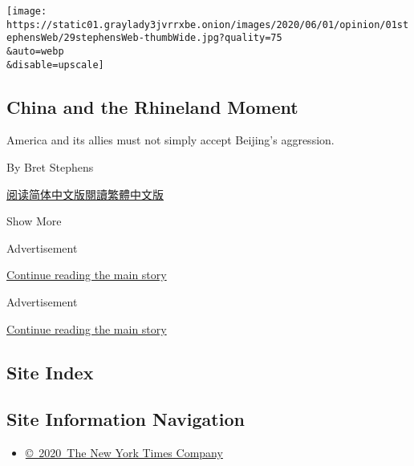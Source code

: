 \begin{enumerate}
  \texttt{[image: https://static01.graylady3jvrrxbe.onion/images/2020/06/01/opinion/01stephensWeb/29stephensWeb-thumbWide.jpg?quality=75\\\&auto=webp\\\&disable=upscale]}

  \hypertarget{china-and-the-rhineland-moment}{%
  \subsection{China and the Rhineland
  Moment}\label{china-and-the-rhineland-moment}}

  America and its allies must not simply accept Beijing's aggression.

  By Bret Stephens

  \href{https://cn.nytimes3xbfgragh.onion/opinion/20200604/china-hong-kong/}{阅读简体中文版}\href{https://cn.nytimes3xbfgragh.onion/opinion/20200604/china-hong-kong/zh-hant/}{閱讀繁體中文版}
\end{enumerate}

Show More

Advertisement

\protect\hyperlink{after-mid1}{Continue reading the main story}

Advertisement

\protect\hyperlink{after-mktg}{Continue reading the main story}

\hypertarget{site-index}{%
\subsection{Site Index}\label{site-index}}

\hypertarget{site-information-navigation}{%
\subsection{Site Information
Navigation}\label{site-information-navigation}}

\begin{itemize}
\tightlist
\item
  \href{https://help.nytimes3xbfgragh.onion/hc/en-us/articles/115014792127-Copyright-notice}{©~2020~The
  New York Times Company}
\end{itemize}

